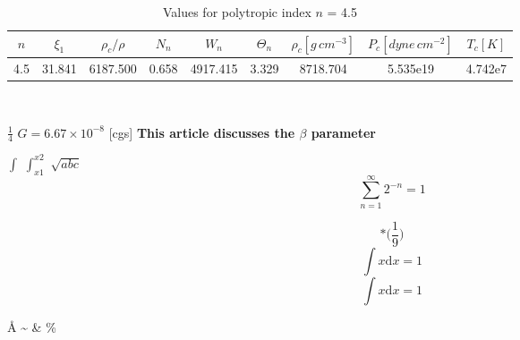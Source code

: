 \documentclass[12pt]{article}
\begin{document}


\begin{table}[h]
\caption{Values for polytropic index $n$ = 4.5}
\centering
\begin{tabular}{ c c c c c c c c c  }
 \hline\hline
$n$ & $\xi_1$ & $\rho_c/\rho$ & $N_{n}$ & $W_n$ & $\Theta_n$
& $\rho_c[g\,cm^{-3}]$ & $P_c[dyne\,cm^{-2}]$ & $T_c[K]$ \\
\hline
4.5 & 31.841 & 6187.500 & 0.658 & 4917.415 & 3.329 & 8718.704 &
5.535e19 & 4.742e7 \\
\hline
\end{tabular}\\
\label{table:nonlin}
\end{table}


$\frac{1}{4}$   %
$G = 6.67\times10^{-8}$ [cgs] %
\textbf{This article discusses the \boldmath$\beta$ parameter}

$\int$ %
$\int_{x1}^{x2}$ %
$\sqrt{abc}$ %
$$\sum_{n=1}^{\infty} 2^{-n} = 1$$ %

\begin{equation}* %
    \bigg(\frac{1}{9}\bigg)
\end{equation}
\begin{equation*} %
    \int x\textrm{d}x = 1
\end{equation*}
$$\int x\textrm{d}x = 1$$ %


\AA{}   %
\infty  %
\sim    %
\approx %
\propto %
\equiv  %
\& \%   %
\pm     %
\end{document}
